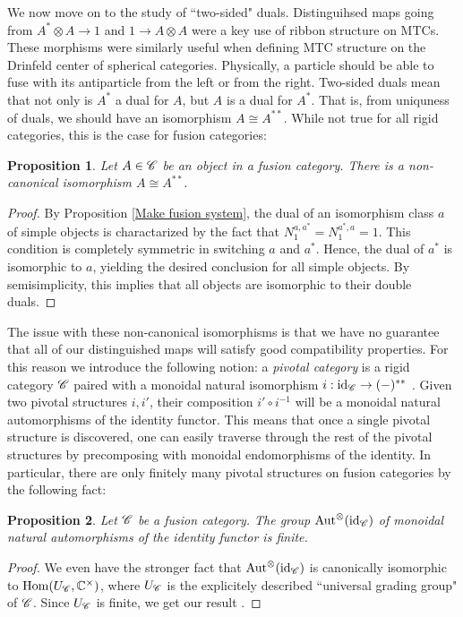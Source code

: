 \documentclass{article}
\newtheorem{proposition}{Proposition}[section]
\theoremstyle{definition}
\numberwithin{figure}{section}
\begin{document}
We now move on to the study of ``two-sided" duals. Distinguihsed maps going from $A^*\otimes A \to 1$ and $1\to A\otimes A$ were a key use of ribbon structure on MTCs. These morphisms were similarly useful when defining MTC structure on the Drinfeld center of spherical categories. Physically, a particle should be able to fuse with its antiparticle from the left or from the right. Two-sided duals mean that not only is $A^*$ a dual for $A$, but $A$ is a dual for $A^*$. That is, from uniquness of duals, we should have an isomorphism $A\cong A^{**}$. While not true for all rigid categories, this is the case for fusion categories:

\begin{proposition}\label{two-duals} Let $A\in \mathscr{C}$ be an object in a fusion category. There is a non-canonical isomorphism $A\cong A^{**}.$
\end{proposition}
\begin{proof} By Proposition \ref{Make fusion system}, the dual of an isomorphism class $a$ of simple objects is charactarized by the fact that $N^{a,a^{*}}_1=N^{a^*,a}_1=1$. This condition is completely symmetric in switching $a$ and $a^*$. Hence, the dual of $a^*$ is isomorphic to $a$, yielding the desired conclusion for all simple objects. By semisimplicity, this implies that all objects are isomorphic to their double duals.
\end{proof}

The issue with these non-canonical isomorphisms is that we have no guarantee that all of our distinguished maps will satisfy good compatibility properties. For this reason we introduce the following notion: a \textit{pivotal category} is a rigid category $\mathscr{C}$ paired with a monoidal natural isomorphism $i:\mathrm{id}_{\mathscr{C}}\to (\--)^{**}$ \cite{selinger2011survey}. Given two pivotal structures $i,i'$, their composition $i'\circ i^{-1}$ will be a monoidal natural automorphisms of the identity functor. This means that once a single pivotal structure is discovered, one can easily traverse through the rest of the pivotal structures by precomposing with monoidal endomorphisms of the identity. In particular, there are only finitely many pivotal structures on fusion categories by the following fact:

\begin{proposition}\label{monoidal endomorphisms} Let $\mathscr{C}$ be a fusion category. The group $\mathrm{Aut}^\otimes(\mathrm{id}_{\mathscr{C}})$ of monoidal natural automorphisms of the identity functor is finite.
\end{proposition}
\begin{proof} We even have the stronger fact that $\mathrm{Aut}^\otimes(\mathrm{id}_{\mathscr{C}})$ is canonically isomorphic to $\mathrm{Hom}(U_{\mathscr{C}},\mathbb{C}^\times)$, where $U_{\mathscr{C}}$ is the explicitely described ``universal grading group" of $\mathscr{C}$. Since $U_{\mathscr{C}}$ is finite, we get our result \cite[Prop. 3.9]{gelaki2008nilpotent}.
\end{proof}
\end{document}
